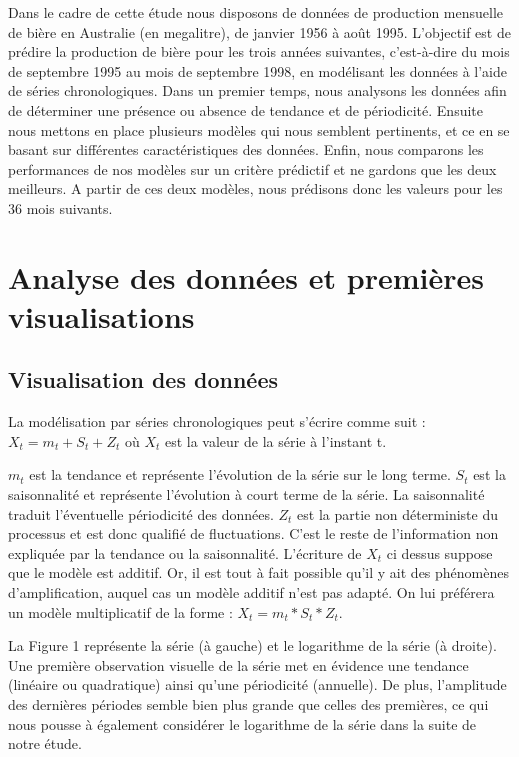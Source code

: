 \documentclass[12pt,a4paper]{book}
\newcommand{\1}{\mathds{1}}
\begin{document}
	Dans le cadre de cette étude nous disposons de données de production mensuelle de bière en Australie (en megalitre), de janvier 1956 à août 1995. L'objectif est de prédire la production de bière pour les trois années suivantes, c'est-à-dire du mois de septembre 1995 au mois de septembre 1998, en modélisant les données à l'aide de séries chronologiques.
Dans un premier temps, nous analysons les données afin de déterminer une présence ou absence de tendance et de périodicité. Ensuite nous mettons en place plusieurs modèles qui nous semblent pertinents, et ce en se basant sur différentes caractéristiques des données. Enfin, nous comparons les performances de nos modèles sur un critère prédictif et ne gardons que les deux meilleurs. A partir de ces deux modèles, nous prédisons donc les valeurs pour les 36 mois suivants.

\vspace{5 mm}


\noindent
\section{Analyse des données et premières visualisations}

\subsection{Visualisation des données}

La modélisation par séries chronologiques peut s'écrire comme suit :\\ 
$X_t = m_t + S_t + Z_t $
où $X_t$ est la valeur de la série à l'instant t.


$m_t$ est la tendance et représente l'évolution de la série sur le long terme.
$S_t$ est la saisonnalité et représente l'évolution à court terme de la série. La saisonnalité traduit l'éventuelle périodicité des données.
$Z_t$ est la partie non déterministe du processus et est donc qualifié de fluctuations. C'est le reste de l'information non expliquée par la tendance ou la saisonnalité.
L'écriture de $X_t$ ci dessus suppose que le modèle est additif. Or, il est tout à fait possible qu'il y ait des phénomènes d'amplification, auquel cas un modèle additif n'est pas adapté. On lui préférera un modèle multiplicatif de la forme : $X_t = m_t*S_t*Z_t$.

\vspace{10 mm}
La Figure 1 représente la série (à gauche) et le logarithme de la série (à droite). \\
Une première observation visuelle de la série met en évidence une tendance (linéaire ou quadratique) ainsi qu'une périodicité (annuelle). De plus, l'amplitude des dernières périodes semble bien plus grande que celles des premières, ce qui nous pousse à également considérer le logarithme de la série dans la suite de notre étude.
\end{document}

